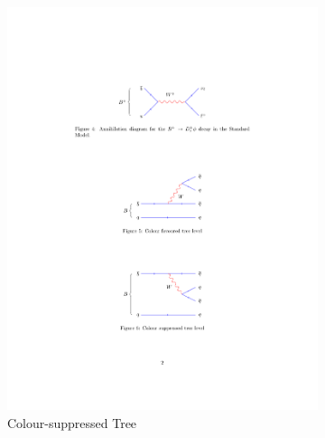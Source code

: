 \begin{figure}[!h]
\begin{subfigure}[b]{0.32\textwidth}
        \includegraphics[width=1.0\textwidth]{figs/Theory/TreeSup.pdf}
        \caption{Colour-suppressed Tree}
    \end{subfigure}
    \begin{subfigure}[b]{0.32\textwidth}
        \centering

\end{subfigure}
\end{figure}
